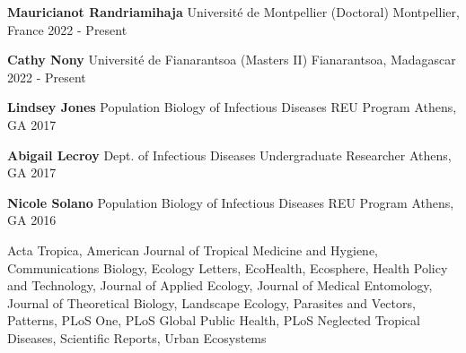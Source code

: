 \begin{cvhonors}

  
    \cvhonor
    {\textbf{Mauricianot Randriamihaja}} %
    {Université de Montpellier (Doctoral)} %
    {Montpellier, France} %
    {2022 - Present} %

    \cvhonor
    {\textbf{Cathy Nony}} %
    {Université de Fianarantsoa (Masters II)} %
    {Fianarantsoa, Madagascar} %
    {2022 - Present} %

  \cvhonor
    {\textbf{Lindsey Jones}} %
    {Population Biology of Infectious Diseases REU Program} %
    {Athens, GA} %
    {2017} %

  \cvhonor
    {\textbf{Abigail Lecroy}} %
    {Dept. of Infectious Diseases Undergraduate Researcher} %
    {Athens, GA} %
    {2017} %

  \cvhonor
    {\textbf{Nicole Solano}} %
    {Population Biology of Infectious Diseases REU Program} %
    {Athens, GA} %
    {2016} %

\end{cvhonors}


Acta Tropica, American Journal of Tropical Medicine and Hygiene, Communications Biology, Ecology Letters, EcoHealth, Ecosphere, Health Policy and Technology, Journal of Applied Ecology, Journal of Medical Entomology, Journal of Theoretical Biology, Landscape Ecology, Parasites and Vectors, Patterns, PLoS One, PLoS Global Public Health, PLoS Neglected Tropical Diseases, Scientific Reports, Urban Ecosystems
